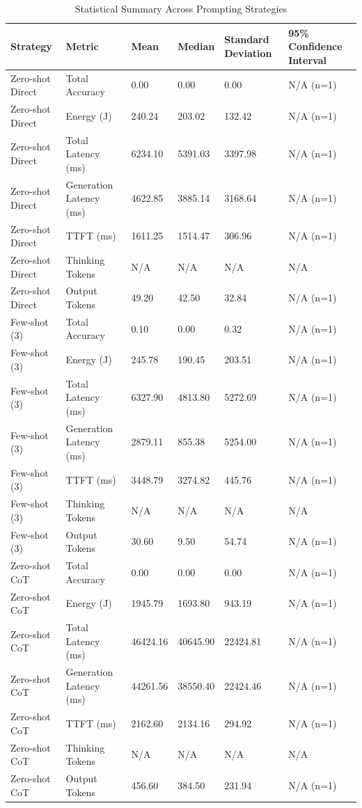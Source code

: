 \begin{table}
\caption{Statistical Summary Across Prompting Strategies}
\label{tab:statistical_summary}
\begin{tabular}{llllll}
\toprule
Strategy & Metric & Mean & Median & Standard Deviation & 95\% Confidence Interval \\
\midrule
Zero-shot Direct & Total Accuracy & 0.00 & 0.00 & 0.00 & N/A (n=1) \\
Zero-shot Direct & Energy (J) & 240.24 & 203.02 & 132.42 & N/A (n=1) \\
Zero-shot Direct & Total Latency (ms) & 6234.10 & 5391.03 & 3397.98 & N/A (n=1) \\
Zero-shot Direct & Generation Latency (ms) & 4622.85 & 3885.14 & 3168.64 & N/A (n=1) \\
Zero-shot Direct & TTFT (ms) & 1611.25 & 1514.47 & 306.96 & N/A (n=1) \\
Zero-shot Direct & Thinking Tokens & N/A & N/A & N/A & N/A \\
Zero-shot Direct & Output Tokens & 49.20 & 42.50 & 32.84 & N/A (n=1) \\
Few-shot (3) & Total Accuracy & 0.10 & 0.00 & 0.32 & N/A (n=1) \\
Few-shot (3) & Energy (J) & 245.78 & 190.45 & 203.51 & N/A (n=1) \\
Few-shot (3) & Total Latency (ms) & 6327.90 & 4813.80 & 5272.69 & N/A (n=1) \\
Few-shot (3) & Generation Latency (ms) & 2879.11 & 855.38 & 5254.00 & N/A (n=1) \\
Few-shot (3) & TTFT (ms) & 3448.79 & 3274.82 & 445.76 & N/A (n=1) \\
Few-shot (3) & Thinking Tokens & N/A & N/A & N/A & N/A \\
Few-shot (3) & Output Tokens & 30.60 & 9.50 & 54.74 & N/A (n=1) \\
Zero-shot CoT & Total Accuracy & 0.00 & 0.00 & 0.00 & N/A (n=1) \\
Zero-shot CoT & Energy (J) & 1945.79 & 1693.80 & 943.19 & N/A (n=1) \\
Zero-shot CoT & Total Latency (ms) & 46424.16 & 40645.90 & 22424.81 & N/A (n=1) \\
Zero-shot CoT & Generation Latency (ms) & 44261.56 & 38550.40 & 22424.46 & N/A (n=1) \\
Zero-shot CoT & TTFT (ms) & 2162.60 & 2134.16 & 294.92 & N/A (n=1) \\
Zero-shot CoT & Thinking Tokens & N/A & N/A & N/A & N/A \\
Zero-shot CoT & Output Tokens & 456.60 & 384.50 & 231.94 & N/A (n=1) \\

\end{tabular}
\end{table}

